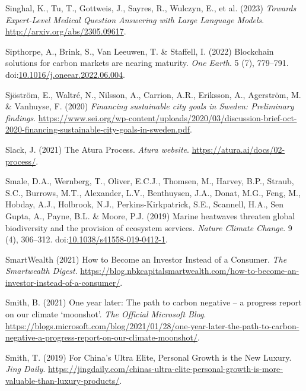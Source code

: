 \documentclass[
  letterpaper,
  DIV=11,
  numbers=noendperiod]{scrartcl}
\newlength{\cslhangindent}
\newenvironment{CSLReferences}[2] %
 {\begin{list}{}{%
  \setlength{\itemindent}{0pt}
  \setlength{\leftmargin}{0pt}
  \setlength{\parsep}{0pt}
  \ifodd #1
   \setlength{\leftmargin}{\cslhangindent}
   \setlength{\itemindent}{-1\cslhangindent}
  \fi
  \setlength{\itemsep}{#2\baselineskip}}}
 {\end{list}}
\begin{document}
\begin{CSLReferences}{0}{1}
Singhal, K., Tu, T., Gottweis, J., Sayres, R., Wulczyn, E., et al.
(2023) \emph{Towards {Expert-Level Medical Question Answering} with
{Large Language Models}}. \url{http://arxiv.org/abs/2305.09617}.

Sipthorpe, A., Brink, S., Van Leeuwen, T. \& Staffell, I. (2022)
Blockchain solutions for carbon markets are nearing maturity. \emph{One
Earth}. 5 (7), 779--791.
doi:\href{https://doi.org/10.1016/j.oneear.2022.06.004}{10.1016/j.oneear.2022.06.004}.

Sjöström, E., Waltré, N., Nilsson, A., Carrion, A.R., Eriksson, A.,
Agerström, M. \& Vanhuyse, F. (2020) \emph{Financing sustainable city
goals in {Sweden}: Preliminary findings}.
\url{https://www.sei.org/wp-content/uploads/2020/03/discussion-brief-oct-2020-financing-sustainable-city-goals-in-sweden.pdf}.

Slack, J. (2021) The {Atura Process}. \emph{Atura website}.
\url{https://atura.ai/docs/02-process/}.

Smale, D.A., Wernberg, T., Oliver, E.C.J., Thomsen, M., Harvey, B.P.,
Straub, S.C., Burrows, M.T., Alexander, L.V., Benthuysen, J.A., Donat,
M.G., Feng, M., Hobday, A.J., Holbrook, N.J., Perkins-Kirkpatrick, S.E.,
Scannell, H.A., Sen Gupta, A., Payne, B.L. \& Moore, P.J. (2019) Marine
heatwaves threaten global biodiversity and the provision of ecosystem
services. \emph{Nature Climate Change}. 9 (4), 306--312.
doi:\href{https://doi.org/10.1038/s41558-019-0412-1}{10.1038/s41558-019-0412-1}.

SmartWealth (2021) How to {Become} an {Investor Instead} of a
{Consumer}. \emph{The Smartwealth Digest}.
\url{https://blog.nbkcapitalsmartwealth.com/how-to-become-an-investor-instead-of-a-consumer/}.

Smith, B. (2021) One year later: {The} path to carbon negative -- a
progress report on our climate {`moonshot'}. \emph{The Official
Microsoft Blog}.
\url{https://blogs.microsoft.com/blog/2021/01/28/one-year-later-the-path-to-carbon-negative-a-progress-report-on-our-climate-moonshot/}.

Smith, T. (2019) For {China}'s {Ultra Elite}, {Personal Growth} is the
{New Luxury}. \emph{Jing Daily}.
\url{https://jingdaily.com/chinas-ultra-elite-personal-growth-is-more-valuable-than-luxury-products/}.


\end{CSLReferences}
\end{document}
